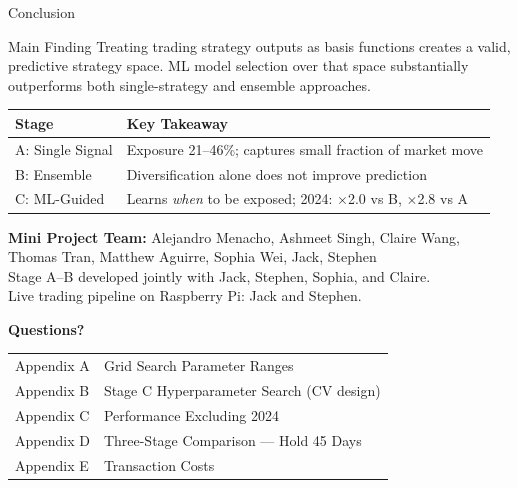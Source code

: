 \documentclass[aspectratio=169]{beamer}
\begin{document}
\begin{frame}{Conclusion}
  \small
  \begin{block}{Main Finding}
    Treating trading strategy outputs as basis functions creates a valid,
    predictive strategy space. ML model selection over that space substantially
    outperforms both single-strategy and ensemble approaches.
  \end{block}

  \vspace{0.3em}
  \begin{tabular}{ll}
    \toprule
    Stage & Key Takeaway \\
    \midrule
    A: Single Signal  & Exposure 21--46\%; captures small fraction of market move \\
    B: Ensemble       & Diversification alone does not improve prediction \\
    C: ML-Guided      & Learns \emph{when} to be exposed; 2024: $\times$2.0 vs B, $\times$2.8 vs A \\
    \bottomrule
  \end{tabular}

  \vspace{0.4em}
  \footnotesize
  \textbf{Mini Project Team:}
  Alejandro Menacho, Ashmeet Singh, Claire Wang, Thomas Tran,
  Matthew Aguirre, Sophia Wei, Jack, Stephen\\[0.2em]
  Stage A--B developed jointly with Jack, Stephen, Sophia, and Claire.\\[0.15em]
  Live trading pipeline on Raspberry Pi: Jack and Stephen.
\end{frame}

\begin{frame}{}
  \begin{center}
    \vspace{2em}
    {\Large\color{qNavy}\textbf{Questions?}}\\[1.5em]
    \small
    \begin{tabular}{ll}
      Appendix A & Grid Search Parameter Ranges \\
      Appendix B & Stage C Hyperparameter Search (CV design) \\
      Appendix C & Performance Excluding 2024 \\
      Appendix D & Three-Stage Comparison --- Hold 45 Days \\
      Appendix E & Transaction Costs \\
    \end{tabular}
  \end{center}
\end{frame}
\end{document}
